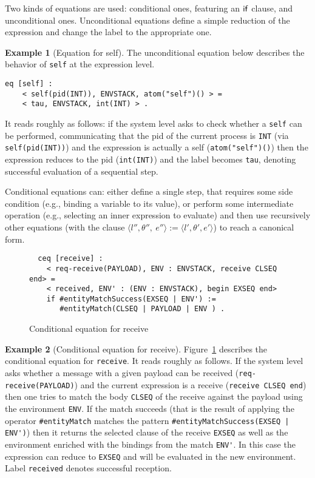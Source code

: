 \documentclass{article}[12pt,a4paper]
\theoremstyle{definition}
\newtheorem{example}{Example}[section]
\begin{document}
Two kinds of equations are used: conditional ones, featuring an
$\mathsf{if}$ clause, and unconditional ones. Unconditional equations
define a simple reduction of the expression and change the label to
the appropriate one.

\begin{example}[Equation for self]
The unconditional equation below describes the behavior of \verb+self+ at the expression level.
\begin{verbatim}
eq [self] :
    < self(pid(INT)), ENVSTACK, atom("self")() > =
    < tau, ENVSTACK, int(INT) > .
\end{verbatim}
It reads roughly as follows: if the system level asks to check whether a \verb+self+ can be performed, communicating that the pid of the current process is \verb+INT+ (via \verb+self(pid(INT))+) and the expression is actually a self (\verb+atom("self")()+) then the expression reduces to the pid (\verb+int(INT)+) and the label becomes \verb+tau+, denoting successful evaluation of a sequential step.
\end{example}

Conditional equations can: either define a single step, that requires
some side condition (e.g., binding a variable to its value), or
perform some intermediate operation (e.g., selecting an inner
expression to evaluate) and then use recursively other equations (with the clause $\langle
    l'',\theta'',~e'' \rangle := \langle l',\theta',e'\rangle$) to
reach a canonical form.

\begin{figure}[t]
  \centering
\begin{verbatim}
  ceq [receive] :
    < req-receive(PAYLOAD), ENV : ENVSTACK, receive CLSEQ end> =
    < received, ENV' : (ENV : ENVSTACK), begin EXSEQ end>
    if #entityMatchSuccess(EXSEQ | ENV') := 
       #entityMatch(CLSEQ | PAYLOAD | ENV ) .
\end{verbatim}
  \caption{Conditional equation for receive}
  \label{fig:eq-rec}
\end{figure}

\begin{example}[Conditional equation for receive]\label{ex:eqrec}
Figure~\ref{fig:eq-rec} describes the conditional equation for
\verb+receive+. It reads roughly as follows. If the system level asks whether
a message with a given payload can be received
(\verb+req-receive(PAYLOAD)+) and the current expression is a receive
(\verb+receive CLSEQ end+) then one tries to match the body
\verb+CLSEQ+ of the receive against the payload using the environment \verb+ENV+. If the match succeeds (that is the result of applying the operator \verb+#entityMatch+ matches the pattern \verb+#entityMatchSuccess(EXSEQ | ENV')+) then it returns the selected clause of the receive \verb+EXSEQ+ as well as the environment enriched with the bindings from the match
 \verb+ENV'+. In this case the expression can reduce to \verb+EXSEQ+ and will be evaluated in the new environment. Label \verb+received+ denotes successful reception.
\end{example}
\end{document}
